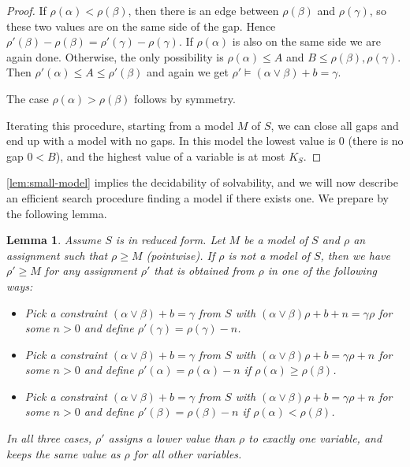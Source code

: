 \documentclass[11pt,a4paper]{article}
\newtheorem{lemma}{Lemma}[theorem]
\begin{document}
\begin{proof}
If $\rho(\alpha) < \rho(\beta)$, then there is an edge between $\rho(\beta)$
and $\rho(\gamma)$, so these two values are on the same side of the gap.
Hence $\rho'(\beta)-\rho(\beta)=\rho'(\gamma)-\rho(\gamma)$.
If $\rho(\alpha)$ is also on the same side we are again done.
Otherwise, the only possibility is $\rho(\alpha)\leq A$ and 
$B\leq\rho(\beta),\rho(\gamma)$. Then $\rho'(\alpha)\leq A\leq \rho'(\beta)$
and again we get $\rho'\models (\alpha\vee\beta)+b = \gamma$.

The case $\rho(\alpha) > \rho(\beta)$ follows by symmetry.

Iterating this procedure, starting from a model $M$ of $S$,
we can close all gaps and end up with a model with no gaps.
In this model the lowest value is $0$ (there is no gap $0<B$),
and the highest value of a variable is at most $K_S$.
\end{proof}

\cref{lem:small-model} implies the decidability of solvability,
and we will now describe an efficient search procedure finding a
model if there exists one. We prepare by the following lemma.

\begin{lemma}\label{lem:model-search}
Assume $S$ is in reduced form.
Let $M$ be a model of $S$ and $\rho$ an assignment such that $\rho\geq M$ (pointwise).
If $\rho$ is not a model of $S$, then we have $\rho'\geq M$ for any assignment $\rho'$
that is obtained from $\rho$ in one of the following ways:
\begin{itemize}
\item Pick a constraint $(\alpha\vee\beta)+b = \gamma$ from $S$ with
$(\alpha\vee\beta)\rho +b+n = \gamma\rho$ for some $n>0$ and
define $\rho'(\gamma) = \rho(\gamma)-n$.
\item Pick a constraint $(\alpha\vee\beta)+b = \gamma$ from $S$ with
$(\alpha\vee\beta)\rho +b = \gamma\rho + n$ for some $n>0$ and
define $\rho'(\alpha) = \rho(\alpha)-n$ if $\rho(\alpha)\geq\rho(\beta)$.
\item Pick a constraint $(\alpha\vee\beta)+b = \gamma$ from $S$ with
$(\alpha\vee\beta)\rho +b = \gamma\rho + n$ for some $n>0$ and
define $\rho'(\beta) = \rho(\beta)-n$ if $\rho(\alpha)<\rho(\beta)$.
\end{itemize}
In all three cases, $\rho'$ assigns a lower value than $\rho$ to exactly one variable,
and keeps the same value as $\rho$ for all other variables.
\end{lemma}
\end{document}

